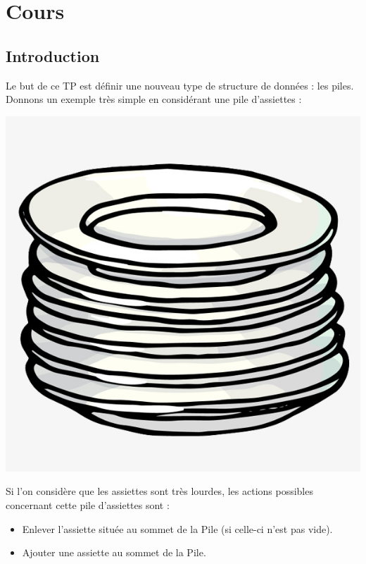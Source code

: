 \documentclass[french,11pt,twoside]{VcCours}
\begin{document}

\tableofcontents
\separationTitre

\section{Cours}

\subsection{Introduction}
Le but de ce TP est définir une nouveau type de structure de données : les piles. 
Donnons un exemple très simple en considérant une pile d'assiettes :

\medskip

\begin{center}
\includegraphics[scale=0.2]{assiette}
\end{center}
Si l'on considère que les assiettes sont très lourdes, les actions 
possibles concernant cette pile d'assiettes sont :
\begin{itemize}
\item Enlever l'assiette située au sommet de la Pile (si celle-ci n'est pas vide).
\item Ajouter une assiette au sommet de la Pile.
\end{itemize}
\end{document}
